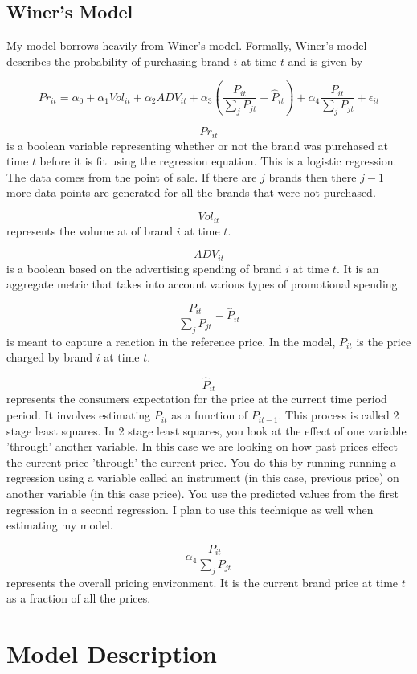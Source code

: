 \documentclass{article}
\begin{document}
\subsection{Winer's Model}
My model borrows heavily from Winer's model. Formally, Winer's model describes the probability of purchasing brand $i$ at time $t$ and is given by

$$ {Pr}_{it} = \alpha_0 + \alpha_1 Vol_{it} + \alpha_2 ADV_{it} +  \alpha_3 (\dfrac{P_{it}} {\sum_j P_{jt}} - \hat{P}_{it})+ \alpha_4 \dfrac {P_{it}}{\sum_j P_{jt}} + \epsilon_{it}$$

$${Pr}_{it}$$ is a boolean variable representing whether or not the brand was purchased at time $t$ before it is fit using the regression equation. This is a logistic regression. The data comes from the point of sale. If there are $j$ brands then there $j-1$ more data points are generated for all the brands that were not purchased.

$$Vol_{it}$$ represents the volume at of brand $i$ at time $t$.

$$ADV_{it}$$ is a boolean based on the advertising spending of brand $i$ at time $t$. It is an aggregate metric that takes into account various types of promotional spending.

$$\dfrac{P_{it}} {\sum_j P_{jt}} - \hat{P}_{it}$$ is meant to capture a reaction in the reference price.  In the model, $P_{it}$ is the price charged by brand $i$ at time $t$. 

$$\hat{P}_{it}$$ represents the consumers expectation for the price at the current time period period. It involves estimating ${P}_{it}$ as a function of ${P}_{it-1}$. This process is called 2 stage least squares. In 2 stage least squares, you look at the effect of one variable 'through' another variable.  In this case we are looking on how past prices effect the current price 'through' the current price. You do this by running running a regression using a variable called an instrument (in this case, previous price) on another variable (in this case price). You use the predicted values from the first regression in a second regression.  I plan to use this technique as well when estimating my model.

$$ \alpha_4 \dfrac {P_{it}}{\sum_j P_{jt}}$$ represents the overall pricing environment. It is the current brand price at time $t$ as a fraction of all the prices.

\section{Model Description}
\end{document}
